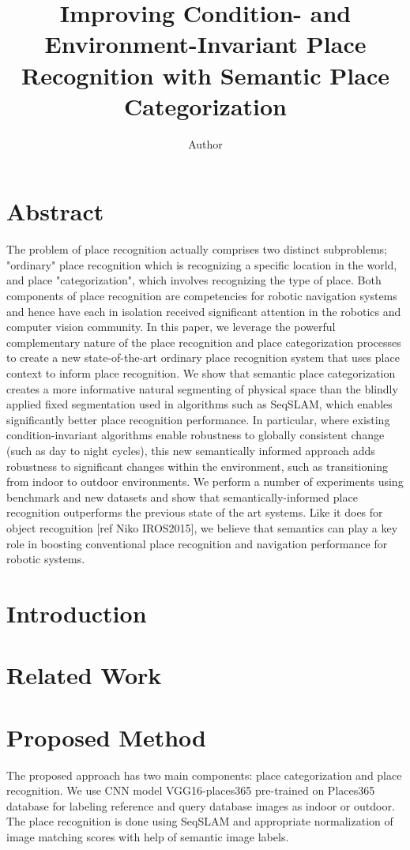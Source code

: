 \documentclass[twocolumn]{article}
\title{Improving Condition- and Environment-Invariant Place Recognition with Semantic Place Categorization}
\author{Author}
\begin{document}
\maketitle

\section{Abstract}
The problem of place recognition actually comprises two distinct subproblems; "ordinary" place recognition which is recognizing a specific location in the world, and place "categorization", which involves recognizing the type of place. Both components of place recognition are competencies for robotic navigation systems and hence have each in isolation received significant attention in the robotics and computer vision community. In this paper, we leverage the powerful complementary nature of the place recognition and place categorization processes to create a new state-of-the-art ordinary place recognition system that uses place context to inform place recognition. We show that semantic place categorization creates a more informative natural segmenting of physical space than the blindly applied fixed segmentation used in algorithms such as SeqSLAM, which enables significantly better place recognition performance. In particular, where existing condition-invariant algorithms enable robustness to globally consistent change (such as day to night cycles), this new semantically informed approach adds robustness to significant changes within the environment, such as transitioning from indoor to outdoor environments. We perform a number of experiments using benchmark and new datasets and show that semantically-informed place recognition outperforms the previous state of the art systems. Like it does for object recognition [ref Niko IROS2015], we believe that  semantics can play a key role in boosting conventional place recognition and navigation performance for robotic systems.

\section{Introduction}

\section{Related Work}

\section{Proposed Method}
The proposed approach has two main components: place categorization and place recognition. We use CNN model VGG16-places365 \cite{cnnPlaces365Github} pre-trained on Places365 database \cite{zhou2014learning} for labeling reference and query database images as indoor or outdoor. The place recognition is done using SeqSLAM \cite{Milford2012} and appropriate normalization of image matching scores with help of semantic image labels.
\end{document}
